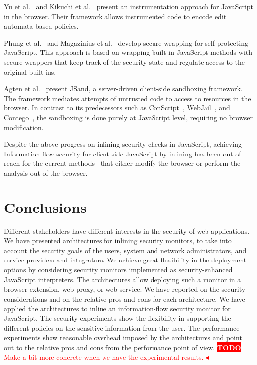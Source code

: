 \documentclass{llncs}
\newcommand{\todo}[1]{\colorbox{red}{\textcolor{white}{\sffamily\bfseries\scriptsize TODO}} \textcolor{red}{#1} \textcolor{red}{$\blacktriangleleft$}}
\begin{document}
Yu et al.~\cite{Yu+:POPL07} and Kikuchi et
al.~\cite{DBLP:conf/aplas/2008} present an instrumentation approach
for JavaScript in the browser. Their framework allows instrumented
code to encode edit automata-based policies.

Phung et al.~\cite{DBLP:conf/ccs/PhungSC09} and 
Magazinius et al.~\cite{DBLP:conf/nordsec/MagaziniusPS10} develop
secure wrapping for self-protecting JavaScript. This approach is based
on wrapping built-in JavaScript methods with secure wrappers that
keep track of the security state and regulate access to the original built-ins.  



Agten et al.~\cite{DBLP:conf/acsac/AgtenABPDP12} present JSand, a
server-driven client-side sandboxing framework. The framework mediates
attempts of untrusted code to access to resources in the browser.  
In contrast to its predecessors such as
ConScript~\cite{DBLP:conf/sp/MeyerovichL10}, WebJail~\cite{DBLP:conf/acsac/AckerRDPJ11}, and Contego~\cite{DBLP:conf/trust/LuoD11},
the sandboxing is done purely at JavaScript level, requiring no
browser modification.

Despite the above progress on inlining security checks in JavaScript, achieving
Information-flow security for client-side JavaScript by inlining has been out of
reach for the current methods~\cite{Vogt+:NDSS07,DBLP:conf/pldi/ChughMJL09,Yip:Narula:Krohn:Morris:EUROSYS09,Jang+:CCS10,DeGroef+:CCS12}  that either
modify the browser or perform the analysis out-of-the-browser.

\section{Conclusions}
\label{sec:conc}
Different stakeholders have different interests in the security of web
applications. We have presented architectures for inlining security
monitors, to take into account the security goals of the users, system and
network administrators, and service providers and integrators.
%
We achieve great flexibility in the deployment options by considering
security monitors implemented as security-enhanced JavaScript interpreters.
%
The architectures allow deploying such a monitor in a browser
extension, web proxy, or web service.
%
We have reported on the security considerations and on the relative pros and
cons for each architecture.
%
We have applied the architectures to inline an information-flow
security monitor for JavaScript.
%
The security experiments show the
flexibility in supporting the different policies on the sensitive
information from the user. 
%
The performance experiments show reasonable overhead imposed by the
architectures and point out to the relative pros and cons from the
performance point of view. \todo{Make a bit more concrete when we have
the experimental results.}
\end{document}
